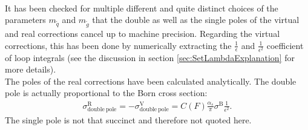 \\
It has been checked for multiple different and quite distinct choices of the parameters $m_{\tilde{q}}$ and $m_{\tilde{g}}$ that the double as well as the single poles of the virtual and real corrections cancel up to machine precision. Regarding the virtual corrections, this has been done by numerically extracting the $\frac{1}{\epsilon}$ and $\frac{1}{\epsilon^2}$ coefficient of loop integrals (see the discussion in section \ref{sec:SetLambdaExplanation} for more details).\\
The poles of the real corrections have been calculated analytically. The double pole is actually proportional to the Born cross section:
\begin{align}
\sigma^{\mathrm{R}}_{\mathrm{double\ pole}} = -\sigma^{\mathrm{V}}_{\mathrm{double\ pole}} = C(F)\frac{\alpha_s}{\pi}\sigma^{\mathrm{B}} \frac{1}{\epsilon^2}.
\end{align}
The single pole is not that succinct and therefore not quoted here.

